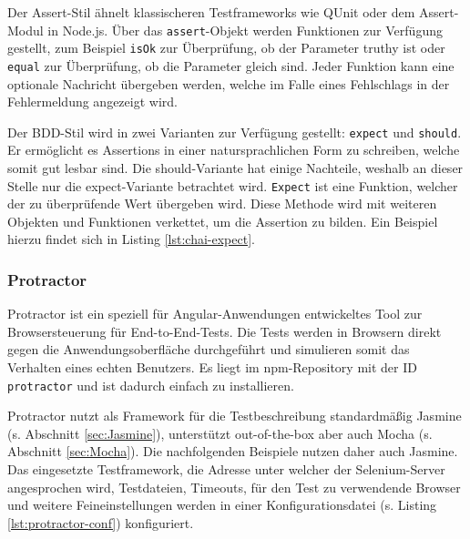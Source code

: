Der Assert-Stil ähnelt klassischeren Testframeworks wie QUnit oder dem Assert-Modul in Node.js. Über das \texttt{assert}-Objekt werden Funktionen zur Verfügung gestellt, zum Beispiel \texttt{isOk} zur Überprüfung, ob der Parameter truthy ist oder \texttt{equal} zur Überprüfung, ob die Parameter gleich sind. Jeder Funktion kann eine optionale Nachricht übergeben werden, welche im Falle eines Fehlschlags in der Fehlermeldung angezeigt wird. \cite{chai-assert}

Der BDD-Stil wird in zwei Varianten zur Verfügung gestellt: \texttt{expect} und \texttt{should}. Er ermöglicht es Assertions in einer natursprachlichen Form zu schreiben, welche somit gut lesbar sind. Die should-Variante hat einige Nachteile, weshalb an dieser Stelle nur die expect-Variante betrachtet wird. \texttt{Expect} ist eine Funktion, welcher der zu überprüfende Wert übergeben wird. Diese Methode wird mit weiteren Objekten und Funktionen verkettet, um die Assertion zu bilden. \cite{chai-styles} Ein Beispiel hierzu findet sich in Listing \ref{lst:chai-expect}.

\begin{figure}[H]
	
\end{figure}

\subsubsection{Protractor}
\label{sec:Protractor}
Protractor ist ein speziell für Angular-Anwendungen entwickeltes Tool zur Browsersteuerung für End-to-End-Tests. Die Tests werden in Browsern direkt gegen die Anwendungsoberfläche durchgeführt und simulieren somit das Verhalten eines echten Benutzers. Es liegt im npm-Repository mit der ID \texttt{protractor} und ist dadurch einfach zu installieren. \cite{protractor-index}

Protractor nutzt als Framework für die Testbeschreibung standardmäßig Jasmine (s. Abschnitt \ref{sec:Jasmine}), unterstützt out-of-the-box aber auch Mocha (s. Abschnitt \ref{sec:Mocha}). Die nachfolgenden Beispiele nutzen daher auch Jasmine. Das eingesetzte Testframework, die Adresse unter welcher der Selenium-Server angesprochen wird, Testdateien, Timeouts, für den Test zu verwendende Browser und weitere Feineinstellungen werden in einer Konfigurationsdatei (s. Listing \ref{lst:protractor-conf}) konfiguriert.

